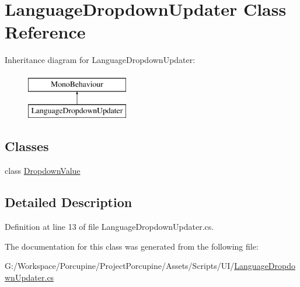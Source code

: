 \hypertarget{class_language_dropdown_updater}{}\section{Language\+Dropdown\+Updater Class Reference}
\label{class_language_dropdown_updater}
Inheritance diagram for Language\+Dropdown\+Updater\+:\begin{figure}[H]
\begin{center}
\leavevmode
\includegraphics[height=2.000000cm]{class_language_dropdown_updater}
\end{center}
\end{figure}
\subsection*{Classes}
\begin{DoxyCompactItemize}
\item 
class \hyperlink{class_language_dropdown_updater_1_1_dropdown_value}{Dropdown\+Value}
\end{DoxyCompactItemize}


\subsection{Detailed Description}


Definition at line 13 of file Language\+Dropdown\+Updater.\+cs.



The documentation for this class was generated from the following file\+:\begin{DoxyCompactItemize}
\item 
G\+:/\+Workspace/\+Porcupine/\+Project\+Porcupine/\+Assets/\+Scripts/\+U\+I/\hyperlink{_language_dropdown_updater_8cs}{Language\+Dropdown\+Updater.\+cs}\end{DoxyCompactItemize}
